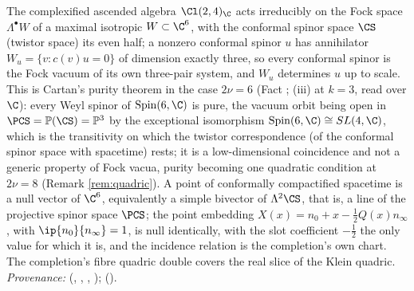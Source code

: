 The complexified ascended algebra $\Cl(2,4)_{\C}$ acts irreducibly on the Fock space $\Lambda^{\bullet}W$ of a maximal isotropic $W \subset \C^{6}$, with the conformal spinor space $\CS$ (twistor space) its even half; a nonzero conformal spinor $u$ has annihilator $W_{u} = \{v : c(v)u = 0\}$ of dimension exactly three, so every conformal spinor is the Fock vacuum of its own three-pair system, and $W_{u}$ determines $u$ up to scale. This is Cartan's purity theorem in the case $2\nu = 6$ (Fact ; (iii) at $k = 3$, read over $\C$): every Weyl spinor of $\mathrm{Spin}(6, \C)$ is pure, the vacuum orbit being open in $\PCS = \mathbb{P}(\CS) = \mathbb{P}^{3}$ by the exceptional isomorphism $\mathrm{Spin}(6, \C) \cong SL(4, \C)$, which is the transitivity on which the twistor correspondence (of the conformal spinor space with spacetime) rests; it is a low-dimensional coincidence and not a generic property of Fock vacua, purity becoming one quadratic condition at $2\nu = 8$ (Remark \ref{rem:quadric}). A point of conformally compactified spacetime is a null vector of $\C^{6}$, equivalently a simple bivector of $\Lambda^{2}\CS$, that is, a line of the projective spinor space $\PCS$; the point embedding $X(x) = n_{0} + x - \tfrac12 Q(x)n_{\infty}$, with $\ip{n_{0}}{n_{\infty}} = 1$, is null identically, with the slot coefficient $-\tfrac12$ the only value for which it is, and the incidence relation is the completion's own chart. The completion's fibre quadric double covers the real slice of the Klein quadric. \emph{Provenance:} \cite[Thm.~3.1, Thm.~3.4, Thm.~4.2, Thm.~5.3]{ButlerT9} (, , , ); \cite[Fact~2.3, Rem.~5.2]{ButlerT11} ().
